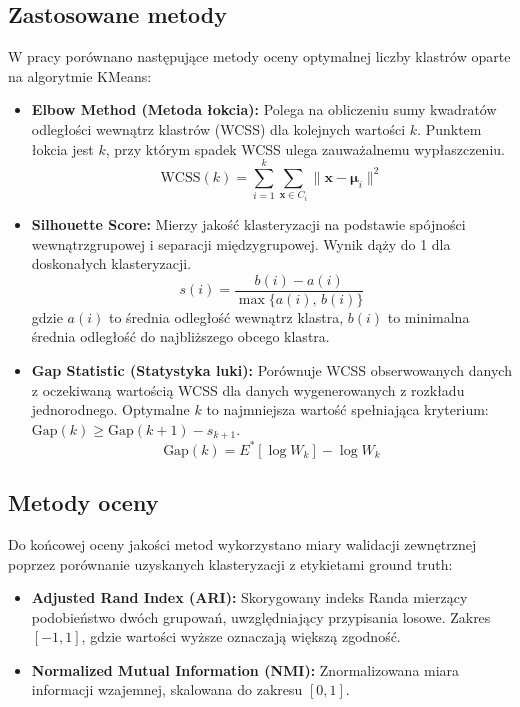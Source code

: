 \documentclass[11pt,a4paper]{article}
\begin{document}
\subsection{Zastosowane metody}

W pracy porównano następujące metody oceny optymalnej liczby klastrów oparte na algorytmie KMeans:
\begin{itemize}[leftmargin=1.5cm]
    \item \textbf{Elbow Method (Metoda łokcia):} Polega na obliczeniu sumy kwadratów odległości wewnątrz klastrów (WCSS) dla kolejnych wartości $k$. Punktem łokcia jest $k$, przy którym spadek WCSS ulega zauważalnemu wypłaszczeniu.
    \begin{equation}
        \text{WCSS}(k) = \sum_{i=1}^{k} \sum_{\mathbf{x} \in C_i} \|\mathbf{x} - \boldsymbol{\mu}_i\|^2
    \end{equation}
    
    \item \textbf{Silhouette Score:} Mierzy jakość klasteryzacji na podstawie spójności wewnątrzgrupowej i separacji międzygrupowej. Wynik dąży do 1 dla doskonałych klasteryzacji.
    \begin{equation}
        s(i) = \frac{b(i) - a(i)}{\max\{a(i),\, b(i)\}}
    \end{equation}
    gdzie $a(i)$ to średnia odległość wewnątrz klastra, $b(i)$ to minimalna średnia odległość do najbliższego obcego klastra.
    
    \item \textbf{Gap Statistic (Statystyka luki):} Porównuje WCSS obserwowanych danych z oczekiwaną wartością WCSS dla danych wygenerowanych z rozkładu jednorodnego. Optymalne $k$ to najmniejsza wartość spełniająca kryterium: $\text{Gap}(k) \geq \text{Gap}(k+1) - s_{k+1}$.
    \begin{equation}
        \text{Gap}(k) = E^*[\log W_k] - \log W_k
    \end{equation}
\end{itemize}

\subsection{Metody oceny}

Do końcowej oceny jakości metod wykorzystano miary walidacji zewnętrznej poprzez porównanie uzyskanych klasteryzacji z etykietami ground truth:
\begin{itemize}[leftmargin=1.5cm]
    \item \textbf{Adjusted Rand Index (ARI):} Skorygowany indeks Randa mierzący podobieństwo dwóch grupowań, uwzględniający przypisania losowe. Zakres $[-1, 1]$, gdzie wartości wyższe oznaczają większą zgodność.
    \item \textbf{Normalized Mutual Information (NMI):} Znormalizowana miara informacji wzajemnej, skalowana do zakresu $[0, 1]$.
\end{itemize}
\end{document}
